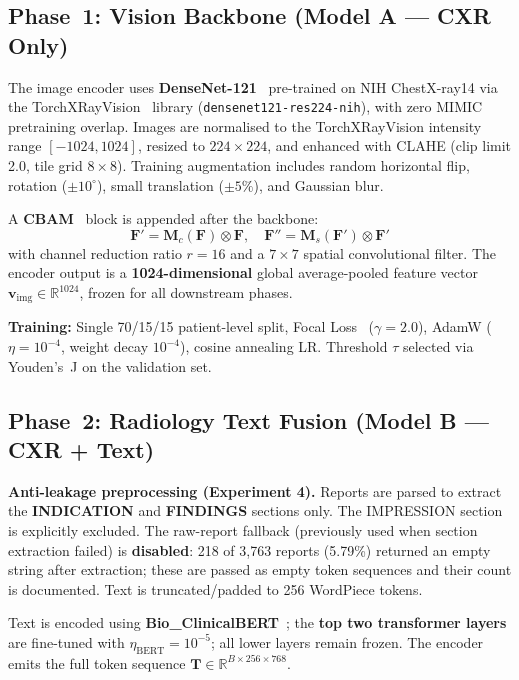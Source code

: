 \documentclass[conference]{IEEEtran}
\begin{document}
\subsection{Phase~1: Vision Backbone (Model A — CXR Only)}

The image encoder uses \textbf{DenseNet-121}~\cite{huang2017densenet} pre-trained on NIH ChestX-ray14 via the TorchXRayVision~\cite{cohen2022torchxrayvision} library (\texttt{densenet121-res224-nih}), with zero MIMIC pretraining overlap. Images are normalised to the TorchXRayVision intensity range $[-1024, 1024]$, resized to $224\times224$, and enhanced with CLAHE (clip limit 2.0, tile grid $8\times8$). Training augmentation includes random horizontal flip, rotation ($\pm10^\circ$), small translation ($\pm5\%$), and Gaussian blur.

A \textbf{CBAM}~\cite{woo2018cbam} block is appended after the backbone:
\begin{equation}
  \mathbf{F}' = \mathbf{M}_c(\mathbf{F}) \otimes \mathbf{F}, \quad \mathbf{F}'' = \mathbf{M}_s(\mathbf{F}') \otimes \mathbf{F}'
\end{equation}
with channel reduction ratio $r\!=\!16$ and a $7\times7$ spatial convolutional filter. The encoder output is a \textbf{1024-dimensional} global average-pooled feature vector $\mathbf{v}_{\text{img}} \in \mathbb{R}^{1024}$, frozen for all downstream phases.

\textbf{Training:} Single 70/15/15 patient-level split, Focal Loss~\cite{lin2017focal} ($\gamma\!=\!2.0$), AdamW ($\eta\!=\!10^{-4}$, weight decay $10^{-4}$), cosine annealing LR. Threshold $\tau$ selected via Youden's~J on the validation set.

\subsection{Phase~2: Radiology Text Fusion (Model B — CXR + Text)}

\textbf{Anti-leakage preprocessing (Experiment 4).} Reports are parsed to extract the \textbf{INDICATION} and \textbf{FINDINGS} sections only. The IMPRESSION section is explicitly excluded. The raw-report fallback (previously used when section extraction failed) is \textbf{disabled}: 218 of 3,763 reports (5.79\%) returned an empty string after extraction; these are passed as empty token sequences and their count is documented. Text is truncated/padded to 256 WordPiece tokens.

Text is encoded using \textbf{Bio\_ClinicalBERT}~\cite{alsentzer2019bert}; the \textbf{top two transformer layers} are fine-tuned with $\eta_{\text{BERT}}\!=\!10^{-5}$; all lower layers remain frozen. The encoder emits the full token sequence $\mathbf{T} \in \mathbb{R}^{B \times 256 \times 768}$.
\end{document}
